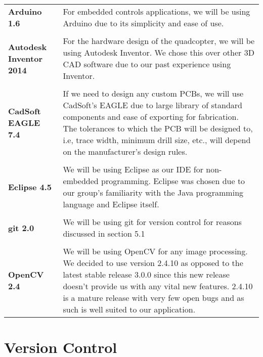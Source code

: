 \documentclass[10pt,letterpaper]{article}
\begin{document}
\begin{center}
	\begin{tabular}{l p{8cm}}
		\textbf{Arduino 1.6}  				& For embedded controls applications, we will be using Arduino due to its simplicity and ease of use. \\ \\
		
		\textbf{Autodesk Inventor 2014} 	& For the hardware design of the quadcopter, we will be using Autodesk Inventor. We chose this over other 3D CAD software due to our past experience using Inventor.\\ \\
		
		\textbf{CadSoft EAGLE 7.4 }			& If we need to design any custom PCBs, we will use CadSoft's EAGLE due to large library of standard components and ease of exporting for fabrication. The tolerances to which the PCB will be designed to, i.e, trace width, minimum drill size, etc., will depend on the manufacturer's design rules.\\ \\
		
		\textbf{Eclipse 4.5} 				& We will be using Eclipse as our IDE for non-embedded programming. Eclipse was chosen due to our group's familiarity with the Java programming language and Eclipse itself.\\ \\
		
		\textbf{git 2.0} 					& We will be using git for version control for reasons discussed in section 5.1\\ \\
		
		\textbf{OpenCV 2.4 }				& We will be using OpenCV for any image processing. We decided to use version 2.4.10 as opposed to the latest stable release 3.0.0 since this new release doesn't provide us with any vital new features. 2.4.10 is a mature release with very few open bugs and as such is well suited to our application.
	\end{tabular}
\end{center}

\newpage


\section{Version Control}
\end{document}
